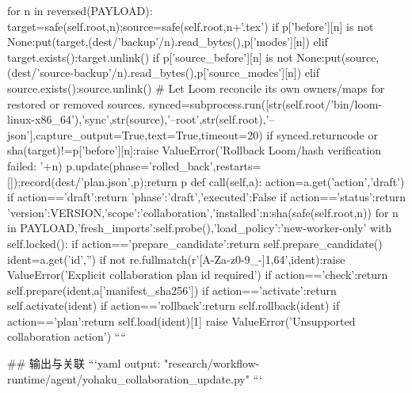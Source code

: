   for n in reversed(PAYLOAD):
   target=safe(self.root,n);source=safe(self.root,n+'.tex')
   if p['before'][n] is not None:put(target,(dest/'backup'/n).read_bytes(),p['modes'][n])
   elif target.exists():target.unlink()
   if p['source_before'][n] is not None:put(source,(dest/'source-backup'/n).read_bytes(),p['source_modes'][n])
   elif source.exists():source.unlink()
   # Let Loom reconcile its own owners/maps for restored or removed sources.
   synced=subprocess.run([str(self.root/'bin/loom-linux-x86_64'),'sync',str(source),'--root',str(self.root),'--json'],capture_output=True,text=True,timeout=20)
   if synced.returncode or sha(target)!=p['before'][n]:raise ValueError('Rollback Loom/hash verification failed: '+n)
  p.update(phase='rolled_back',restarts=[]);record(dest/'plan.json',p);return p
 def call(self,a):
  action=a.get('action','draft')
  if action=='draft':return {'phase':'draft','executed':False}
  if action=='status':return {'version':VERSION,'scope':'collaboration','installed':{n:sha(safe(self.root,n)) for n in PAYLOAD},'fresh_imports':self.probe(),'load_policy':'new-worker-only'}
  with self.locked():
   if action=='prepare_candidate':return self.prepare_candidate()
   ident=a.get('id','')
   if not re.fullmatch(r'[A-Za-z0-9_-]{1,64}',ident):raise ValueError('Explicit collaboration plan id required')
   if action=='check':return self.prepare(ident,a['manifest_sha256'])
   if action=='activate':return self.activate(ident)
   if action=='rollback':return self.rollback(ident)
   if action=='plan':return self.load(ident)[1]
   raise ValueError('Unsupported collaboration action')
````

## 输出与关联
```yaml
output: "research/workflow-runtime/agent/yohaku_collaboration_update.py"
```
